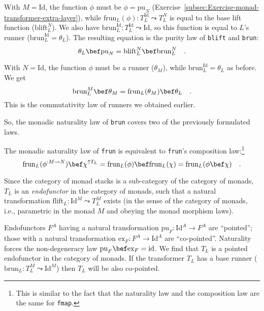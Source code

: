 With $M=\text{Id}$, the function $\phi$ must be $\phi=\text{pu}_{N}$
(Exercise~\ref{subsec:Exercise-monad-transformer-extra-layer}),
while $\text{frun}_{L}(\phi):T_{L}^{\text{Id}}\leadsto T_{L}^{N}$
is equal to the base lift function ($\text{blift}_{L}^{N}$). We also
have $\text{brun}_{L}^{\text{Id}}:T_{L}^{\text{Id}}\leadsto\text{Id}$,
so this function is equal to $L$\textsf{'}s runner ($\text{brun}_{L}^{\text{Id}}=\theta_{L}$).
The resulting equation is the purity law of \lstinline!blift! and
\lstinline!brun!:
\[
\theta_{L}\bef\text{pu}_{N}=\text{blift}_{L}^{N}\bef\text{brun}_{L}^{N}\quad.
\]

With $N=\text{Id}$, the function $\phi$ must be a runner ($\theta_{M}$),
while $\text{brun}_{L}^{\text{Id}}=\theta_{L}$ as before. We get
\[
\text{brun}_{L}^{M}\bef\theta_{M}=\text{frun}_{L}(\theta_{M})\bef\theta_{L}\quad.
\]
This is the commutativity law of runners we obtained earlier.

So, the monadic naturality law of \lstinline!brun! covers two of
the previously formulated laws.

The monadic naturality law of \lstinline!frun! is equivalent to \lstinline!frun!\textsf{'}s
composition law:\footnote{This is similar to the fact that the naturality law and the composition
law are the same for \lstinline!fmap!.}
\[
\text{frun}_{L}(\phi^{:M\leadsto N})\bef\chi^{\uparrow T_{L}}=\text{frun}_{L}(\phi)\bef\text{frun}_{L}(\chi)=\text{frun}_{L}(\phi\bef\chi)\quad.
\]

Since the category of monad stacks is a sub-category of the category
of monads, $T_{L}$ is an \emph{endofunctor}
in the category of monads, such that a natural transformation $\text{flift}_{L}:\text{Id}^{M}\leadsto T_{L}^{M}$
exists (in the sense of the category of monads, i.e., parametric in
the monad $M$ and obeying the monad morphism laws). 

Endofunctors $F^{A}$ having a natural transformation $\text{pu}_{F}:\text{Id}^{A}\rightarrow F^{A}$
are \textsf{``}pointed\textsf{''};
those with a natural transformation $\text{ex}_{F}:F^{A}\rightarrow\text{Id}^{A}$
are \textsf{``}co-pointed\textsf{''}.
Naturality forces the non-degeneracy law $\text{pu}_{F}\bef\text{ex}_{F}=\text{id}$.
We find that $T_{L}$ is a pointed endofunctor in the category of
monads. If the transformer $T_{L}$ has a base runner ($\text{brun}_{L}:T_{L}^{M}\leadsto\text{Id}^{M}$)
then $T_{L}$ will be also co-pointed.

